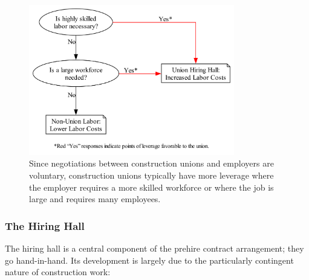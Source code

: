 \documentclass[12pt]{article}
\newcommand{\imageWidth}{0.8\textwidth}
\begin{document}
\begin{figure}[ht]
  \centering
  \includegraphics[width=\imageWidth]{images/union_power_red}
  \captionsetup{justification=centering, singlelinecheck=false, margin=2cm} 
  \caption[Union Leverage and Power]{Since negotiations between construction unions and employers are voluntary, construction unions typically have more leverage where the employer requires a more skilled workforce or where the job is large and requires many employees.}
  \label{fig:union_power_red}
\end{figure}

\subsubsection{The Hiring Hall}

The hiring hall is a central component of the prehire contract arrangement; they go hand-in-hand. Its development is largely due to the particularly contingent nature of construction work:
\end{document}
